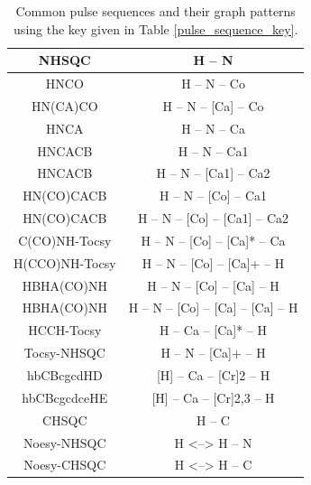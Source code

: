 \begin{table}
    \begin{tabular}{ | c | c | }
    \hline
    NHSQC           &  H -- N                               \\  \hline
    HNCO            &  H -- N -- Co                         \\  \hline
    HN(CA)CO        &  H -- N -- [Ca] -- Co                 \\  \hline
    HNCA            &  H -- N -- Ca                         \\  \hline
    HNCACB          &  H -- N -- Ca1                        \\  \hline
    HNCACB          &  H -- N -- [Ca1] -- Ca2               \\  \hline
    HN(CO)CACB      &  H -- N -- [Co] -- Ca1                \\  \hline
    HN(CO)CACB      &  H -- N -- [Co] -- [Ca1] -- Ca2       \\  \hline
    C(CO)NH-Tocsy   &  H -- N -- [Co] -- [Ca]* -- Ca        \\  \hline
    H(CCO)NH-Tocsy  &  H -- N -- [Co] -- [Ca]+ -- H         \\  \hline
    HBHA(CO)NH      &  H -- N -- [Co] -- [Ca] -- H          \\  \hline
    HBHA(CO)NH      &  H -- N -- [Co] -- [Ca] -- [Ca] -- H  \\  \hline
    HCCH-Tocsy      &  H -- Ca -- [Ca]* -- H                \\  \hline
    Tocsy-NHSQC     &  H -- N -- [Ca]+ -- H                 \\  \hline
    hbCBcgcdHD      &  [H] -- Ca -- [Cr]{2} -- H            \\  \hline
    hbCBcgcdceHE    &  [H] -- Ca -- [Cr]{2,3} -- H          \\  \hline  
    CHSQC           &  H -- C                               \\  \hline
    Noesy-NHSQC     &  H <--> H -- N                        \\  \hline
    Noesy-CHSQC     &  H <--> H -- C                        \\  \hline
    \end{tabular}
    \caption{Common pulse sequences and their graph patterns using the key
             given in Table \ref{pulse_sequence_key}.}
    \label{pulse_sequence_patterns}
\end{table}

